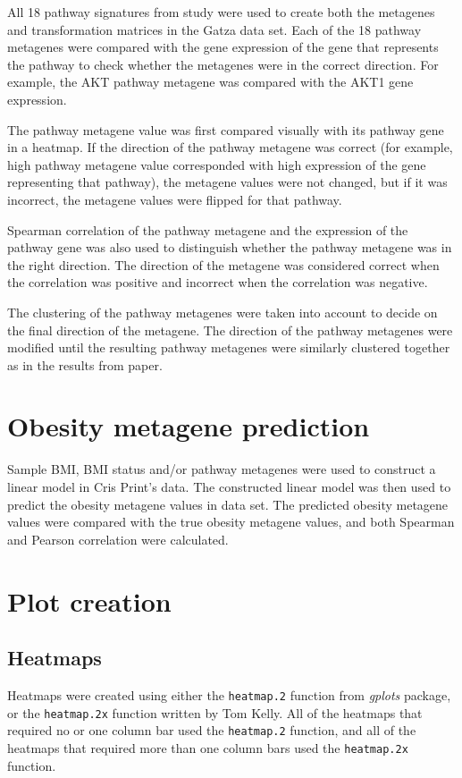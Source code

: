 All 18 pathway signatures from \citet{Gatza2010a} study were used to create both the metagenes and transformation matrices in the Gatza data set.
Each of the 18 pathway metagenes were compared with the gene expression of the gene that represents the pathway to check whether the metagenes were in the correct direction.
For example, the AKT pathway metagene was compared with the AKT1 gene expression.

The pathway metagene value was first compared visually with its pathway gene in a heatmap.
If the direction of the pathway metagene was correct (for example, high pathway metagene value corresponded with high expression of the gene representing that pathway), the metagene values were not changed, but if it was incorrect, the metagene values were flipped for that pathway.

Spearman correlation of the pathway metagene and the expression of the pathway gene was also used to distinguish whether the pathway metagene was in the right direction.
The direction of the metagene was considered correct when the correlation was positive and incorrect when the correlation was negative.

The clustering of the pathway metagenes were taken into account to decide on the final direction of the metagene.
The direction of the pathway metagenes were modified until the resulting pathway metagenes were similarly clustered together as in the results from \citet{Gatza2010a} paper.

\section{Obesity metagene prediction}
\label{sec:obesity_metagene_prediction}

Sample BMI, BMI status and/or pathway metagenes were used to construct a linear model in Cris Print's data.
The constructed linear model was then used to predict the obesity metagene values in \citet{Creighton2012} data set.
The predicted obesity metagene values were compared with the true obesity metagene values, and both Spearman and Pearson correlation were calculated.

\section{Plot creation}
\label{sec:plot_creation}

\subsection{Heatmaps}
\label{sub:heatmaps}

Heatmaps were created using either the \texttt{heatmap.2} function from \textit{gplots} package, or the \texttt{heatmap.2x} function written by Tom Kelly.
All of the heatmaps that required no or one column bar used the \texttt{heatmap.2} function, and all of the heatmaps that required more than one column bars used the \texttt{heatmap.2x} function.




